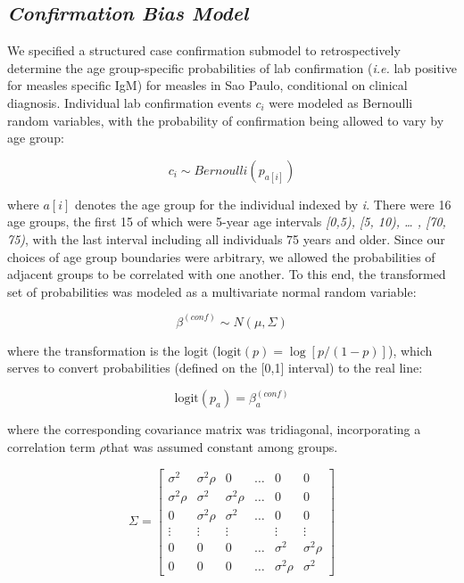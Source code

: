 \subsection{\texorpdfstring{\emph{Confirmation Bias
Model}}{Confirmation Bias Model}}\label{confirmation-bias-model}

We specified a structured case confirmation submodel to retrospectively
determine the age group-specific probabilities of lab confirmation (\emph{i.e.}
lab positive for measles specific IgM) for measles in Sao Paulo,
conditional on clinical diagnosis. Individual lab confirmation events
\(c_i\) were modeled as Bernoulli random variables,
with the probability of confirmation being allowed to vary by age group:

\[c_{i} \sim Bernoulli(p_{a[i]})\]

where \(a[i]\) denotes the age group for the individual
indexed by \emph{i}. There were 16 age groups, the first 15 of which
were 5-year age intervals \emph{{[}0,5), {[}5, 10), \ldots{} , {[}70,
75)}, with the last interval including all individuals 75 years and
older. Since our choices of age group boundaries were arbitrary, we
allowed the probabilities of adjacent groups to be correlated with one
another. To this end, the transformed set of probabilities was
modeled as a multivariate normal random variable: 

\[
\beta^{(conf)} \sim N(\mu, \Sigma)
\]

where the transformation is the logit (\(\text{logit}(p) = \log[p / (1-p)] \)), which serves to convert probabilities (defined on the [0,1] interval) to the real line:

\[
\text{logit}(p_a) = \beta_a^{(conf)}
\]

where the corresponding covariance matrix was tridiagonal, incorporating a
correlation term \(\rho\)that was assumed constant among groups.

\[
\Sigma = \left[{
\begin{array}{cccccc}
  {\sigma^2} & {\sigma^2 \rho} & 0& \ldots & {0} & {0}  \\
  {\sigma^2 \rho} & {\sigma^2} &  \sigma^2 \rho & \ldots & {0}  & {0} \\
  {0} & \sigma^2 \rho & {\sigma^2} & \ldots & {0} & {0} \\
  \vdots & \vdots & \vdots &  & \vdots & \vdots\\
  {0} & {0} & 0 & \ldots &  {\sigma^2} & \sigma^2 \rho  \\
{0} & {0} & 0 & \ldots & \sigma^2 \rho &  {\sigma^2} 
\end{array}
}\right]\]


